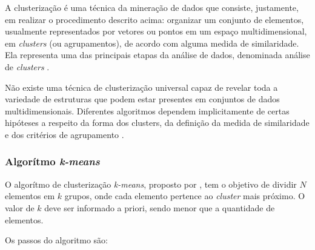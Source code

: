 A clusterização é uma técnica da mineração de dados que consiste, justamente, em realizar o procedimento descrito acima: organizar um conjunto de elementos, usualmente representados por vetores ou pontos em um espaço multidimensional, em \textit{clusters} (ou agrupamentos), de acordo com alguma medida de similaridade. Ela representa uma das principais etapas da análise de dados, denominada análise de \textit{clusters} \cite{jain1999}.

Não existe uma técnica de clusterização universal capaz de revelar toda a variedade de estruturas que podem estar presentes em conjuntos de dados multidimensionais. Diferentes algoritmos dependem implicitamente de certas hipóteses a respeito da forma dos clusters, da definição da medida de similaridade e dos critérios de agrupamento \cite{estivill2002}.

\subsubsection{Algorítmo \textit{k-means}}
\label{sub:k_means}

O algorítmo de clusterização \textit{k-means}, proposto por , tem o objetivo de dividir \(N\) elementos em \(k\) grupos, onde cada elemento pertence ao \textit{cluster} mais próximo. O valor de \(k\) deve ser informado a priori, sendo menor que a quantidade de elementos.

Os passos do algoritmo são:

